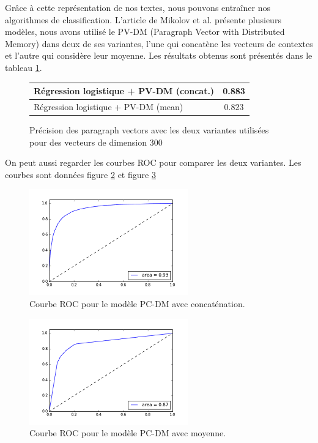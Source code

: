 \documentclass{article}
\begin{document}
Grâce à cette représentation de nos textes, nous pouvons entraîner nos algorithmes de classification. L'article de Mikolov et al. présente plusieurs modèles, nous avons utilisé le PV-DM (Paragraph Vector with Distributed Memory) dans deux de ses variantes, l'une qui concatène les vecteurs de contextes et l'autre qui considère leur moyenne. Les résultats obtenus sont présentés dans le tableau \ref{results_pv}.

\begin{figure}[h]
\begin{center}
\begin{tabular}{|l|c|}
	\hline
	Régression logistique + PV-DM (concat.) & 0.883 \\
	\hline
	Régression logistique + PV-DM (mean)  & 0.823 \\
	\hline
\end{tabular}
\caption{Précision des paragraph vectors avec les deux variantes utilisées pour des vecteurs de dimension 300}
\label{results_pv}
\end{center}
\end{figure} 

On peut aussi regarder les courbes ROC pour comparer les deux variantes. Les courbes sont données figure \ref{pcdmconcat} et figure \ref{pcdmmean}
\begin{figure}[h]
\begin{center}
\includegraphics{images/pvdmconcat.png}
\caption{Courbe ROC pour le modèle PC-DM avec concaténation.}
\label{pcdmconcat}
\end{center}
\end{figure}
\clearpage

\begin{figure}[h]
\begin{center}
\includegraphics{images/pvdmmean.png}
\caption{Courbe ROC pour le modèle PC-DM avec moyenne.}
\label{pcdmmean}
\end{center}
\end{figure}
\end{document}
